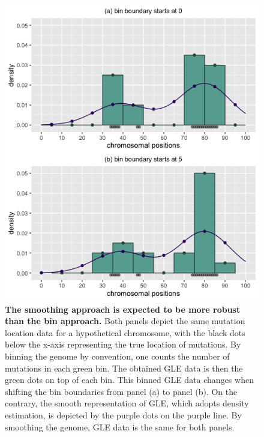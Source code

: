\begin{figure}[h!]
  \begin{minipage}[c]{0.48\textwidth}
    \caption{
      \textbf{The smoothing approach is expected to be more robust than the bin approach.} Both panels depict the same mutation location data for a hypothetical chromosome, with the black dots below the x-axis representing the true location of mutations. By binning the genome by convention, one counts the number of mutations in each green bin. The obtained GLE data is then the green dots on top of each bin. This binned GLE data changes when shifting the bin boundaries from panel (a) to panel (b). On the contrary, the smooth representation of GLE, which adopts \gls{density} estimation, is depicted by the purple dots on the purple line. By smoothing the genome, GLE data is the same for both panels. 
    } \label{fig:mutdistribution_demo}
  \end{minipage}\hfill
  \begin{minipage}[c]{0.55\textwidth}
    \includegraphics[width=\textwidth]{graphics/mutdistribution_demo.png}
  \end{minipage}
\end{figure}

